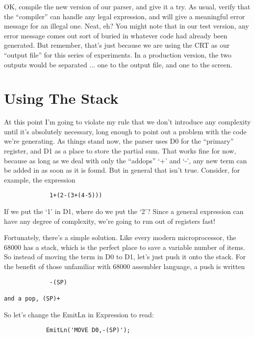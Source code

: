 OK, compile the new version of our parser, and give it a try. As usual, verify  that  the  ``compiler''   can   handle   any  legal expression, and  will  give a meaningful error  message  for  an illegal one. Neat, eh?  You might note that in our test version, any error message comes  out  sort of buried in whatever code had already been  generated. But remember, that's just because we are using  the  CRT  as  our  ``output  file''  for   this   series  of experiments. In a production version, the two  outputs  would be separated ... one to the output file, and one to the screen.

\section{Using The Stack}

At  this  point  I'm going to  violate  my  rule  that  we  don't introduce any complexity until  it's  absolutely  necessary, long enough to point out a problem with the code we're generating. As things stand now, the parser  uses D0 for the ``primary'' register, and D1 as  a place to store the partial sum. That works fine for now, because  as  long as we deal with only the ``addops'' `+' and `-', any new term can be added in as soon as it is found. But in general that isn't true. Consider, for example, the expression

\begin{verbatim}
             1+(2-(3+(4-5)))
\end{verbatim}

If we put the `1' in D1, where  do  we  put  the  `2'?    Since a general expression can have any degree of complexity, we're going to run out of registers fast!

Fortunately, there's  a  simple  solution. Like  every modern microprocessor, the 68000 has a stack, which is the perfect place to save a variable number of items. So instead of moving the term in D0 to  D1, let's just push it onto the stack. For the benefit of  those unfamiliar with 68000 assembler  language, a  push  is written

\begin{verbatim}
             -(SP)

and a pop, (SP)+ 
\end{verbatim}

So let's change the EmitLn in Expression to read:

\begin{verbatim}
            EmitLn('MOVE D0,-(SP)');
\end{verbatim}

